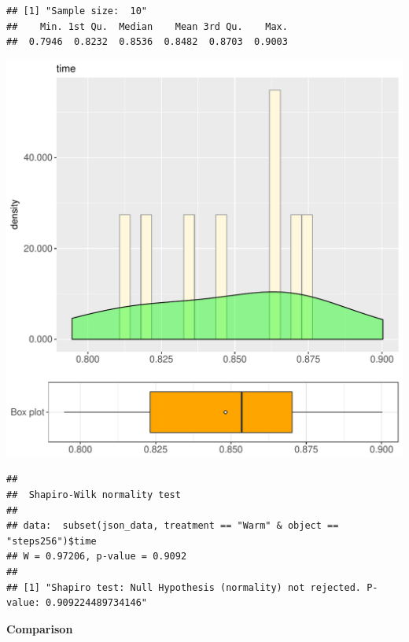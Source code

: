 \documentclass{article}\usepackage[]{graphicx}\usepackage[]{color}
\makeatletter
\def\maxwidth{ %
  \ifdim\Gin@nat@width>\linewidth
    \linewidth
  \else
    \Gin@nat@width
  \fi
}
\newenvironment{kframe}{%
 \def\at@end@of@kframe{}%
 \ifinner\ifhmode%
  \def\at@end@of@kframe{\end{minipage}}%
  \begin{minipage}{\columnwidth}%
 \fi\fi%
 \def\FrameCommand##1{\hskip\@totalleftmargin \hskip-\fboxsep
 \colorbox{shadecolor}{##1}\hskip-\fboxsep
     \hskip-\linewidth \hskip-\@totalleftmargin \hskip\columnwidth}%
 \MakeFramed {\advance\hsize-\width
   \@totalleftmargin\z@ \linewidth\hsize
   \@setminipage}}%
 {\par\unskip\endMakeFramed%
 \at@end@of@kframe}
\newenvironment{knitrout}{}{} %
\makeatother
\begin{document}
\begin{knitrout}
\color{fgcolor}\begin{kframe}
\begin{verbatim}
## [1] "Sample size:  10"
##    Min. 1st Qu.  Median    Mean 3rd Qu.    Max. 
##  0.7946  0.8232  0.8536  0.8482  0.8703  0.9003
\end{verbatim}
\end{kframe}
\includegraphics[width=\maxwidth]{figure/RH1_Warm_steps256-1} 
\begin{kframe}\begin{verbatim}
## 
## 	Shapiro-Wilk normality test
## 
## data:  subset(json_data, treatment == "Warm" & object == "steps256")$time
## W = 0.97206, p-value = 0.9092
## 
## [1] "Shapiro test: Null Hypothesis (normality) not rejected. P-value: 0.909224489734146"
\end{verbatim}
\end{kframe}
\end{knitrout}
  
 \textbf{Comparison}
  
\end{document}
